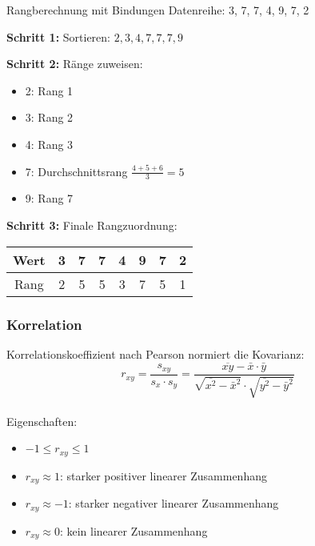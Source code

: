 \begin{example2}{Rangberechnung mit Bindungen}
Datenreihe: 3, 7, 7, 4, 9, 7, 2

\textbf{Schritt 1:} Sortieren:
$2, 3, 4, 7, 7, 7, 9$

\textbf{Schritt 2:} Ränge zuweisen:
\begin{itemize}
    \item 2: Rang 1
    \item 3: Rang 2
    \item 4: Rang 3
    \item 7: Durchschnittsrang $\frac{4+5+6}{3} = 5$
    \item 9: Rang 7
\end{itemize}

\textbf{Schritt 3:} Finale Rangzuordnung:
\begin{center}
\begin{tabular}{|c|c|c|c|c|c|c|c|}
\hline
Wert & 3 & 7 & 7 & 4 & 9 & 7 & 2 \\
\hline
Rang & 2 & 5 & 5 & 3 & 7 & 5 & 1 \\
\hline
\end{tabular}
\end{center}
\end{example2}

\subsubsection{Korrelation}

\begin{corollary}{Korrelationskoeffizient nach Pearson}
normiert die Kovarianz:
$$r_{xy} = \frac{s_{xy}}{s_x \cdot s_y} = \frac{\overline{xy} - \bar{x} \cdot \bar{y}}{\sqrt{\overline{x^2} - \bar{x}^2} \cdot \sqrt{\overline{y^2} - \bar{y}^2}}$$
\vspace{-5mm}\\
Eigenschaften:
\begin{itemize}
    \item $-1 \leq r_{xy} \leq 1$
    \item $r_{xy} \approx 1$: starker positiver linearer Zusammenhang
    \item $r_{xy} \approx -1$: starker negativer linearer Zusammenhang
    \item $r_{xy} \approx 0$: kein linearer Zusammenhang
\end{itemize}
\end{corollary}


